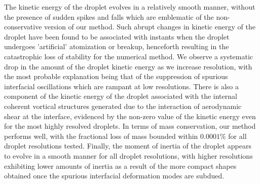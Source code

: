 The kinetic energy of the droplet evolves in a relatively smooth manner, without the presence of sudden spikes and falls which are emblematic of the non-conservative version of our method. Such abrupt changes in kinetic energy of the droplet have been found to be associated with instants when the droplet undergoes 'artificial' atomization or breakup, henceforth resulting in the catastrophic loss of stability for the numerical method. We observe a systematic drop in the amount of the droplet kinetic energy as we increase resolution, with the most probable explanation being that of the suppression of spurious interfacial oscillations which are rampant at low resolutions. There is also a component of the kinetic energy of the droplet associated with the internal coherent vortical structures generated due to the interaction of aerodynamic shear at the interface, evidenced by the non-zero value of the kinetic energy even for the most highly resolved droplets. In terms of mass conservation, our method performs well, with the fractional loss of mass bounded within $0.0001 \%$ for all droplet resolutions tested. Finally, the moment of inertia of the droplet appears to evolve in a smooth manner for all droplet resolutions, with higher resolutions exhibiting lower amounts of inertia as a result of the more compact shapes obtained once the spurious interfacial deformation modes are subdued.          




\vspace*{0.2cm}


